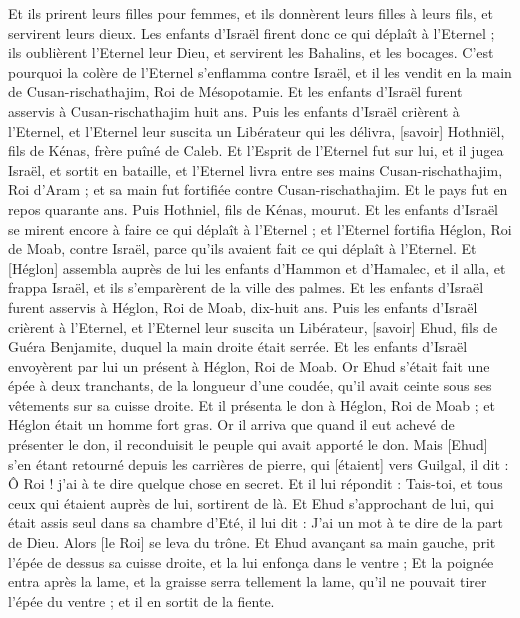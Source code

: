 \begin{multicols}{2}
Et ils prirent leurs filles pour femmes, et ils donnèrent leurs filles à leurs fils, et servirent leurs dieux.
Les enfants d'Israël firent donc ce qui déplaît à l'Eternel ; ils oublièrent l'Eternel leur Dieu, et servirent les Bahalins, et les bocages.
C'est pourquoi la colère de l'Eternel s'enflamma contre Israël, et il les vendit en la main de Cusan-rischathajim, Roi de Mésopotamie. Et les enfants d'Israël furent asservis à Cusan-rischathajim huit ans.
Puis les enfants d'Israël crièrent à l'Eternel, et l'Eternel leur suscita un Libérateur qui les délivra, [savoir] Hothniël, fils de Kénas, frère puîné de Caleb.
Et l'Esprit de l'Eternel fut sur lui, et il jugea Israël, et sortit en bataille, et l'Eternel livra entre ses mains Cusan-rischathajim, Roi d'Aram ; et sa main fut fortifiée contre Cusan-rischathajim.
Et le pays fut en repos quarante ans. Puis Hothniel, fils de Kénas, mourut.
Et les enfants d'Israël se mirent encore à faire ce qui déplaît à l'Eternel ; et l'Eternel fortifia Héglon, Roi de Moab, contre Israël, parce qu'ils avaient fait ce qui déplaît à l'Eternel.
Et [Héglon] assembla auprès de lui les enfants d'Hammon et d'Hamalec, et il alla, et frappa Israël, et ils s'emparèrent de la ville des palmes.
Et les enfants d'Israël furent asservis à Héglon, Roi de Moab, dix-huit ans.
Puis les enfants d'Israël crièrent à l'Eternel, et l'Eternel leur suscita un Libérateur, [savoir] Ehud, fils de Guéra Benjamite, duquel la main droite était serrée. Et les enfants d'Israël envoyèrent par lui un présent à Héglon, Roi de Moab.
Or Ehud s'était fait une épée à deux tranchants, de la longueur d'une coudée, qu'il avait ceinte sous ses vêtements sur sa cuisse droite.
Et il présenta le don à Héglon, Roi de Moab ; et Héglon était un homme fort gras.
Or il arriva que quand il eut achevé de présenter le don, il reconduisit le peuple qui avait apporté le don.
Mais [Ehud] s'en étant retourné depuis les carrières de pierre, qui [étaient] vers Guilgal, il dit : Ô Roi ! j'ai à te dire quelque chose en secret. Et il lui répondit : Tais-toi, et tous ceux qui étaient auprès de lui, sortirent de là.
Et Ehud s'approchant de lui, qui était assis seul dans sa chambre d'Eté, il lui dit : J'ai un mot à te dire de la part de Dieu. Alors [le Roi] se leva du trône.
Et Ehud avançant sa main gauche, prit l'épée de dessus sa cuisse droite, et la lui enfonça dans le ventre ;
Et la poignée entra après la lame, et la graisse serra tellement la lame, qu'il ne pouvait tirer l'épée du ventre ; et il en sortit de la fiente.

\end{multicols}
